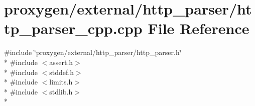 \section{proxygen/external/http\+\_\+parser/http\+\_\+parser\+\_\+cpp.cpp File Reference}
\label{http__parser__cpp_8cpp}
{\ttfamily \#include \char`\"{}proxygen/external/http\+\_\+parser/http\+\_\+parser.\+h\char`\"{}}\\*
{\ttfamily \#include $<$assert.\+h$>$}\\*
{\ttfamily \#include $<$stddef.\+h$>$}\\*
{\ttfamily \#include $<$limits.\+h$>$}\\*
{\ttfamily \#include $<$stdlib.\+h$>$}\\*
